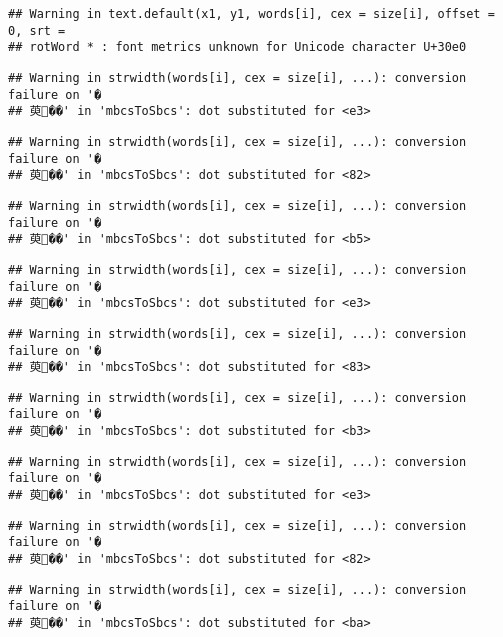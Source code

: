 \documentclass[]{article}
\begin{document}
\begin{verbatim}
## Warning in text.default(x1, y1, words[i], cex = size[i], offset = 0, srt =
## rotWord * : font metrics unknown for Unicode character U+30e0
\end{verbatim}

\begin{verbatim}
## Warning in strwidth(words[i], cex = size[i], ...): conversion failure on '�
## 萸��' in 'mbcsToSbcs': dot substituted for <e3>
\end{verbatim}

\begin{verbatim}
## Warning in strwidth(words[i], cex = size[i], ...): conversion failure on '�
## 萸��' in 'mbcsToSbcs': dot substituted for <82>
\end{verbatim}

\begin{verbatim}
## Warning in strwidth(words[i], cex = size[i], ...): conversion failure on '�
## 萸��' in 'mbcsToSbcs': dot substituted for <b5>
\end{verbatim}

\begin{verbatim}
## Warning in strwidth(words[i], cex = size[i], ...): conversion failure on '�
## 萸��' in 'mbcsToSbcs': dot substituted for <e3>
\end{verbatim}

\begin{verbatim}
## Warning in strwidth(words[i], cex = size[i], ...): conversion failure on '�
## 萸��' in 'mbcsToSbcs': dot substituted for <83>
\end{verbatim}

\begin{verbatim}
## Warning in strwidth(words[i], cex = size[i], ...): conversion failure on '�
## 萸��' in 'mbcsToSbcs': dot substituted for <b3>
\end{verbatim}

\begin{verbatim}
## Warning in strwidth(words[i], cex = size[i], ...): conversion failure on '�
## 萸��' in 'mbcsToSbcs': dot substituted for <e3>
\end{verbatim}

\begin{verbatim}
## Warning in strwidth(words[i], cex = size[i], ...): conversion failure on '�
## 萸��' in 'mbcsToSbcs': dot substituted for <82>
\end{verbatim}

\begin{verbatim}
## Warning in strwidth(words[i], cex = size[i], ...): conversion failure on '�
## 萸��' in 'mbcsToSbcs': dot substituted for <ba>
\end{verbatim}
\end{document}
